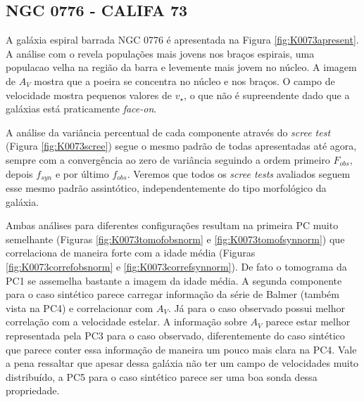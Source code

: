 \subsection{NGC 0776 - CALIFA 73}

A galáxia espiral barrada NGC 0776 é apresentada na Figura \ref{fig:K0073apresent}. A análise com o \starlight revela
populações mais jovens nos braços espirais, uma populacao velha na região da barra e levemente mais jovem no núcleo. A
imagem de $A_V$ mostra que a poeira se concentra no núcleo e nos braços. O campo de velocidade mostra pequenos valores
de $v_\star$, o que não é supreendente dado que a galáxias está praticamente {\em face-on}.

A análise da variância percentual de cada componente através do {\em scree test} (Figura \ref{fig:K0073scree}) segue o
mesmo padrão de todas apresentadas até agora, sempre com a convergência ao zero de variância seguindo a ordem primeiro
$F_{obs}$, depois $f_{syn}$ e por último $f_{obs}$. Veremos que todos os {\em scree tests} avaliados seguem esse mesmo
padrão assintótico, independentemente do tipo morfológico da galáxia.

Ambas análises para diferentes configurações resultam na primeira PC muito semelhante (Figuras
\ref{fig:K0073tomofobsnorm} e \ref{fig:K0073tomofsynnorm}) que correlaciona de maneira forte com a idade média (Figuras
\ref{fig:K0073correfobsnorm} e \ref{fig:K0073correfsynnorm}). De fato o tomograma da PC1 se assemelha bastante a imagem
da idade média. A segunda componente para o caso sintético parece carregar informação da série de Balmer (também vista
na PC4) e correlacionar com $A_V$. Já para o caso observado possui melhor correlação com a velocidade estelar. A
informação sobre $A_V$ parece estar melhor representada pela PC3 para o caso observado, diferentemente do caso sintético
que parece conter essa informação de maneira um pouco mais clara na PC4. Vale a pena ressaltar que apesar dessa galáxia
não ter um campo de velocidades muito distribuído, a PC5 para o caso sintético parece ser uma boa sonda dessa
propriedade.

